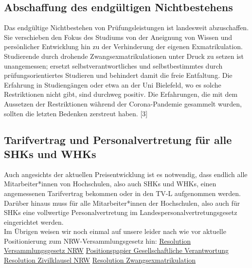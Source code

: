 \documentclass[DIV=calc]{scrartcl}
\begin{document}
\subsection*{Abschaffung des endgültigen Nichtbestehens}
Das endgültige Nichtbestehen von Prüfungsleistungen ist landesweit abzuschaffen. Sie verschieben den Fokus des Studiums von der Aneignung von Wissen und persönlicher Entwicklung hin zu der Verhinderung der eigenen Exmatrikulation. Studierende durch drohende Zwangsexmatrikulationen unter Druck zu setzen ist unangemessen; ersetzt selbstverantwortliches und selbstbestimmtes durch prüfungsorientiertes Studieren und behindert damit die freie Entfaltung. Die Erfahrung in Studiengängen oder etwa an der Uni Bielefeld, wo es solche Restriktionen nicht gibt, sind durchweg positiv. Die Erfahrungen, die mit dem Aussetzen der Restriktionen während der Corona-Pandemie gesammelt wurden, sollten die letzten Bedenken zerstreut haben. [3]
\newpage
\subsection*{Tarifvertrag und Personalvertretung für alle SHKs und WHKs}
Auch angesichts der aktuellen Preisentwicklung ist es notwendig, dass endlich alle Mitarbeiter*innen von Hochschulen, also auch SHKs und WHKs, einen angemessenen Tarifvertrag bekommen oder in den TV-L aufgenommen werden. Darüber hinaus muss für alle Mitarbeiter*innen der Hochschulen, also auch für SHKs eine vollwertige Personalvertretung im Landespersonalvertretungsgesetz eingerichtet werden.\\

Im Übrigen weisen wir noch einmal auf unsere leider nach wie vor aktuelle Positionierung zum NRW-Versammlungsgesetz hin:
\newline \href{https://zapfev.de/resolutionen/wise21/Versammlungsgesetz_NRW/VersammlungsgesetzNRW.pdf}{Resolution Versammlungsgesetz NRW}
\newline \newline
[1] \href{https://zapfev.de/resolutionen/sose17/gesellschaftlich_verantwortung/PosPapier_gesellschaftliche_verwantwortung.pdf}{Positionspapier Gesellschaftliche Verantwortung} \newline
[2]  \href{https://zapfev.de/resolutionen/sose19/Unterschriftenkampagne_Zivilklausel/Reso_Unterschriftenkampagne.pdf}{Resolution Zivilklausel NRW} \newline
[3] \href{https://zapfev.de/resolutionen/wise17/Zwangsexmatrikulation/Zwangsexmatrikulation.pdf}{Resolution Zwangsexmatrikulation} \newline
\end{document}
